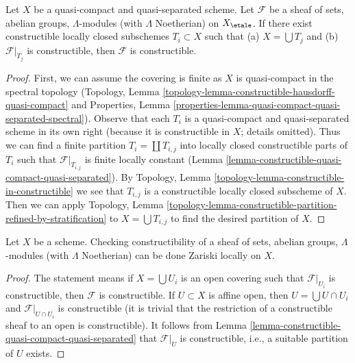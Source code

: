 \begin{lemma}
\label{lemma-constructible-constructible}
Let $X$ be a quasi-compact and quasi-separated scheme.
Let $\mathcal{F}$ be a sheaf of sets, abelian groups,
$\Lambda$-modules (with $\Lambda$ Noetherian) on $X_\etale$.
If there exist constructible locally closed subschemes $T_i \subset X$
such that (a) $X = \bigcup T_j$ and (b) $\mathcal{F}|_{T_j}$ is
constructible, then $\mathcal{F}$ is constructible.
\end{lemma}

\begin{proof}
First, we can assume the covering is finite as $X$ is quasi-compact
in the spectral topology
(Topology, Lemma \ref{topology-lemma-constructible-hausdorff-quasi-compact}
and
Properties, Lemma
\ref{properties-lemma-quasi-compact-quasi-separated-spectral}).
Observe that each $T_i$ is a quasi-compact and quasi-separated
scheme in its own right (because it is constructible in $X$; details omitted).
Thus we can find a finite partition $T_i = \coprod T_{i, j}$ into
locally closed constructible parts of $T_i$ such that
$\mathcal{F}|_{T_{i, j}}$ is finite locally constant
(Lemma \ref{lemma-constructible-quasi-compact-quasi-separated}).
By Topology, Lemma \ref{topology-lemma-constructible-in-constructible}
we see that $T_{i, j}$ is a constructible locally closed subscheme of $X$.
Then we can apply Topology, Lemma
\ref{topology-lemma-constructible-partition-refined-by-stratification}
to $X = \bigcup T_{i, j}$ to find the desired partition of $X$.
\end{proof}

\begin{lemma}
\label{lemma-constructible-local}
Let $X$ be a scheme. Checking constructibility of a sheaf
of sets, abelian groups, $\Lambda$-modules (with $\Lambda$ Noetherian)
can be done Zariski locally on $X$.
\end{lemma}

\begin{proof}
The statement means if $X = \bigcup U_i$ is an open covering
such that $\mathcal{F}|_{U_i}$ is constructible, then $\mathcal{F}$
is constructible. If $U \subset X$ is affine open, then
$U = \bigcup U \cap U_i$ and $\mathcal{F}|_{U \cap U_i}$ is constructible
(it is trivial that the restriction of a constructible sheaf to
an open is constructible). It follows from
Lemma \ref{lemma-constructible-quasi-compact-quasi-separated}
that $\mathcal{F}|_U$ is constructible, i.e., a suitable partition
of $U$ exists.
\end{proof}

